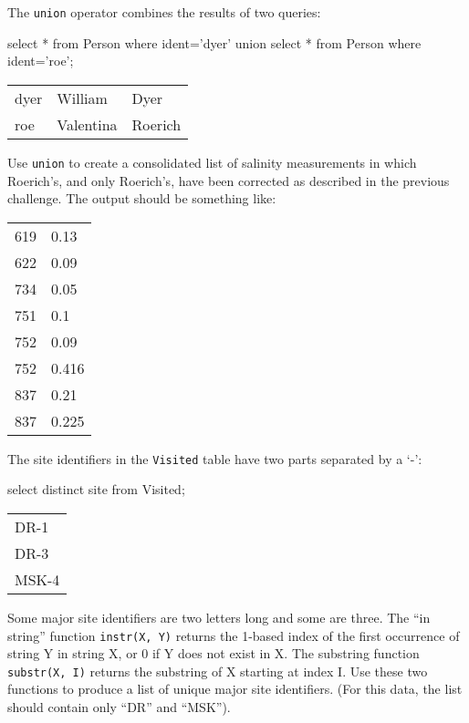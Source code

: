 \documentclass{book}
\begin{document}
\begin{challenge}
  The \texttt{union} operator combines the results of two queries:
\begin{VerbIn}
select * from Person where ident='dyer' union select * from Person where ident='roe';
\end{VerbIn}

\begin{tabular}{lll}
dyer & William & Dyer \\
roe & Valentina & Roerich \\
\end{tabular}

Use \texttt{union} to create a consolidated list of salinity
measurements in which Roerich's, and only Roerich's, have been corrected
as described in the previous challenge. The output should be something
like:

\begin{tabular}{ll}
619 & 0.13 \\
622 & 0.09 \\
734 & 0.05 \\
751 & 0.1 \\
752 & 0.09 \\
752 & 0.416 \\
837 & 0.21 \\
837 & 0.225 \\
\end{tabular}
\end{challenge}

\begin{challenge}
  The site identifiers in the \texttt{Visited} table have two parts
  separated by a `-':

\begin{VerbIn}
select distinct site from Visited;
\end{VerbIn}

\begin{tabular}{l}
DR-1 \\
DR-3 \\
MSK-4 \\
\end{tabular}

Some major site identifiers are two letters long and some are three. The
``in string'' function \texttt{instr(X, Y)} returns the 1-based index of
the first occurrence of string Y in string X, or 0 if Y does not exist
in X. The substring function \texttt{substr(X, I)} returns the substring
of X starting at index I. Use these two functions to produce a list of
unique major site identifiers. (For this data, the list should contain
only ``DR'' and ``MSK'').
\end{challenge}
\end{document}
